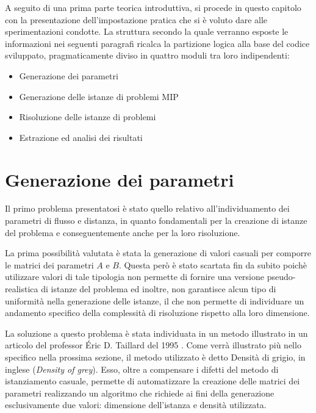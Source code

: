 A seguito di una prima parte teorica introduttiva, si procede in questo capitolo con la presentazione 
dell'impostazione pratica che si è voluto dare alle sperimentazioni condotte. La struttura secondo la quale verranno esposte 
le informazioni nei seguenti paragrafi ricalca la partizione logica alla base del codice sviluppato, pragmaticamente diviso 
in quattro moduli tra loro indipendenti:
\begin{itemize}
    \item Generazione dei parametri
    \item Generazione delle istanze di problemi MIP
    \item Risoluzione delle istanze di problemi
    \item Estrazione ed analisi dei risultati
\end{itemize}




\section{Generazione dei parametri}
\label{sec:pargen}
Il primo problema presentatosi è stato quello relativo all'individuamento dei parametri di flusso e distanza, in quanto 
fondamentali per la creazione di istanze del problema e conseguentemente anche per la loro risoluzione.

La prima possibilità valutata è stata la generazione di valori casuali per comporre le matrici dei parametri $A$ e $B$. 
Questa però è stato scartata fin da subito poichè utilizzare valori di tale tipologia non permette di fornire una versione 
pseudo-realistica di istanze del problema ed inoltre, non garantisce alcun tipo di uniformità nella generazione delle istanze, 
il che non permette di individuare un andamento specifico della complessità di risoluzione rispetto alla loro dimensione.

La soluzione a questo problema è stata individuata in un metodo illustrato in un articolo del professor Éric D. Taillard del 1995
\cite{TAILLARD}. Come verrà illustrato più nello specifico nella prossima sezione, il metodo utilizzato è detto Densità di
grigio, in inglese (\textit{Density of grey}). Esso, oltre a compensare i difetti del metodo di istanziamento casuale, permette
di automatizzare la creazione delle matrici dei parametri realizzando un algoritmo che richiede ai fini della generazione 
esclusivamente due valori: dimensione dell'istanza e densità utilizzata.

